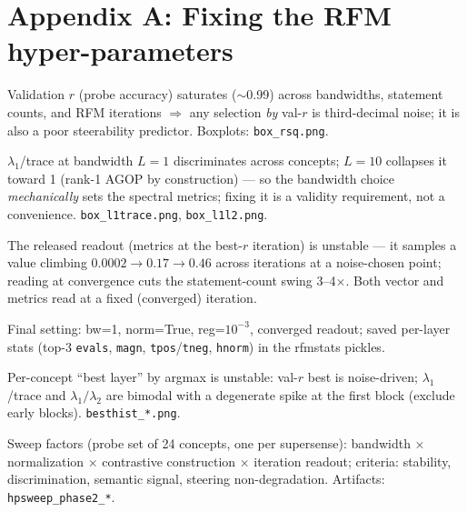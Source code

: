 %
%
\appendix

\section{Appendix A: Fixing the RFM hyper-parameters}
\begin{outline}
\item [+] Validation $r$ (probe accuracy) saturates ($\sim$0.99) across bandwidths, statement counts, and RFM iterations $\Rightarrow$ any selection \emph{by} val-$r$ is third-decimal noise; it is also a poor steerability predictor. Boxplots: \texttt{box\_rsq.png}.
\item [+] $\lambda_1$/trace at bandwidth $L{=}1$ discriminates across concepts; $L{=}10$ collapses it toward 1 (rank-1 AGOP by construction) --- so the bandwidth choice \emph{mechanically} sets the spectral metrics; fixing it is a validity requirement, not a convenience. \texttt{box\_l1trace.png}, \texttt{box\_l1l2.png}.
\item [+] The released readout (metrics at the best-$r$ iteration) is unstable --- it samples a value climbing $0.0002 \to 0.17 \to 0.46$ across iterations at a noise-chosen point; reading at convergence cuts the statement-count swing 3--4$\times$. Both vector and metrics read at a fixed (converged) iteration.
\item [+] Final setting: bw=1, norm=True, reg=$10^{-3}$, converged readout; saved per-layer stats (top-3 \texttt{evals}, \texttt{magn}, \texttt{tpos}/\texttt{tneg}, \texttt{hnorm}) in the rfmstats pickles.
\item [?] Per-concept ``best layer'' by argmax is unstable: val-$r$ best is noise-driven; $\lambda_1$/trace and $\lambda_1/\lambda_2$ are bimodal with a degenerate spike at the first block (exclude early blocks). \texttt{besthist\_*.png}.
\item [?] Sweep factors (probe set of 24 concepts, one per supersense): bandwidth $\times$ normalization $\times$ contrastive construction $\times$ iteration readout; criteria: stability, discrimination, semantic signal, steering non-degradation. Artifacts: \texttt{hpsweep\_phase2\_*}.
\end{outline}

